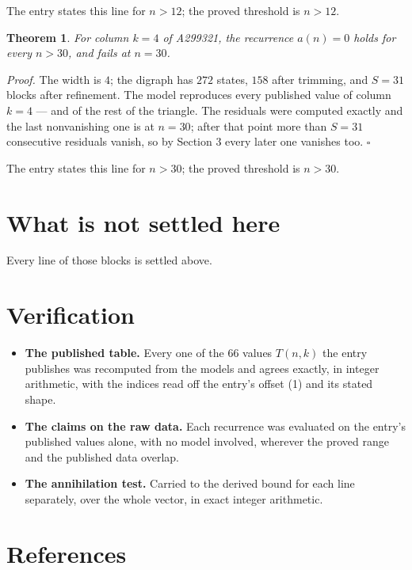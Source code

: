 \documentclass[11pt]{article}
\newtheorem{theorem}{Theorem}
\theoremstyle{definition}
\begin{document}
The entry states this line for $n > 12$; the proved threshold is $n > 12$.

\begin{theorem} For column $k = 4$ of A299321, the recurrence $a(n) = 0$ holds for every $n > 30$, and fails at $n = 30$.\end{theorem}

{\itshape Proof.} The width is $4$; the digraph has $272$ states, $158$ after trimming, and $S = 31$ blocks after refinement. The model reproduces every published value of column $k = 4$ --- and of the rest of the triangle. The residuals were computed exactly and the last nonvanishing one is at $n = 30$; after that point more than $S = 31$ consecutive residuals vanish, so by Section 3 every later one vanishes too. $\square$

The entry states this line for $n > 30$; the proved threshold is $n > 30$.

\section{What is not settled here}

Every line of those blocks is settled above.

\section{Verification}

\begin{itemize}

\item {\bfseries The published table.} Every one of the 66 values $T(n,k)$ the entry publishes was recomputed from the models and agrees exactly, in integer arithmetic, with the indices read off the entry's offset (1) and its stated shape.

\item {\bfseries The claims on the raw data.} Each recurrence was evaluated on the entry's published values alone, with no model involved, wherever the proved range and the published data overlap.

\item {\bfseries The annihilation test.} Carried to the derived bound for each line separately, over the whole vector, in exact integer arithmetic.

\end{itemize}

\section{References}
\end{document}
